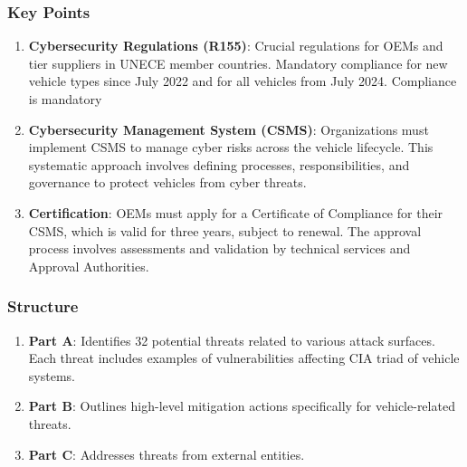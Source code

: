 \subsubsection{Key Points}\label{subsubsec:key-points}
\begin{enumerate}
    \item \textbf{Cybersecurity Regulations (R155)}: Crucial regulations for OEMs and tier suppliers in UNECE member countries.
    Mandatory compliance for new vehicle types since July 2022 and for all vehicles from July 2024.
    Compliance is mandatory
    \item \textbf{Cybersecurity Management System (CSMS)}: Organizations must implement CSMS to manage cyber risks across the vehicle lifecycle.
    This systematic approach involves defining processes, responsibilities, and governance to protect vehicles from cyber threats.
    \item \textbf{Certification}: OEMs must apply for a Certificate of Compliance for their CSMS, which is valid for three years, subject to renewal.
    The approval process involves assessments and validation by technical services and Approval Authorities.
\end{enumerate}


\subsubsection{Structure}\label{subsubsec:structure}
\begin{enumerate}
    \item \textbf{Part A}: Identifies 32 potential threats related to various attack surfaces.
    Each threat includes examples of vulnerabilities affecting CIA triad of vehicle systems.
    \item \textbf{Part B}: Outlines high-level mitigation actions specifically for vehicle-related threats.
    \item \textbf{Part C}: Addresses threats from external entities.
\end{enumerate}

